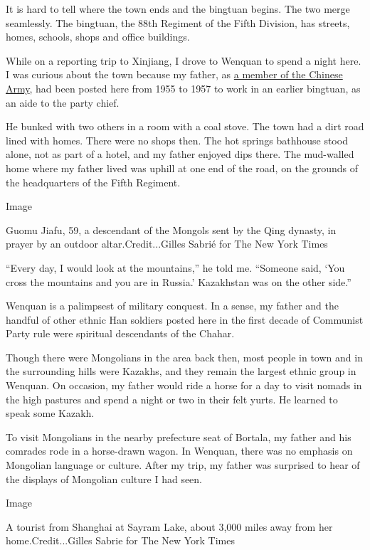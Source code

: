 It is hard to tell where the town ends and the bingtuan begins. The two
merge seamlessly. The bingtuan, the 88th Regiment of the Fifth Division,
has streets, homes, schools, shops and office buildings.

While on a reporting trip to Xinjiang, I drove to Wenquan to spend a
night here. I was curious about the town because my father, as
\href{https://www.nytimes3xbfgragh.onion/2016/12/29/world/asia/great-wall-china.html?mcubz=2\&_r=0}{a
member of the Chinese Army}, had been posted here from 1955 to 1957 to
work in an earlier bingtuan, as an aide to the party chief.

He bunked with two others in a room with a coal stove. The town had a
dirt road lined with homes. There were no shops then. The hot springs
bathhouse stood alone, not as part of a hotel, and my father enjoyed
dips there. The mud-walled home where my father lived was uphill at one
end of the road, on the grounds of the headquarters of the Fifth
Regiment.

Image

Guomu Jiafu, 59, a descendant of the Mongols sent by the Qing dynasty,
in prayer by an outdoor altar.Credit...Gilles Sabrié for The New York
Times

``Every day, I would look at the mountains,'' he told me. ``Someone
said, `You cross the mountains and you are in Russia.' Kazakhstan was on
the other side.''

Wenquan is a palimpsest of military conquest. In a sense, my father and
the handful of other ethnic Han soldiers posted here in the first decade
of Communist Party rule were spiritual descendants of the Chahar.

Though there were Mongolians in the area back then, most people in town
and in the surrounding hills were Kazakhs, and they remain the largest
ethnic group in Wenquan. On occasion, my father would ride a horse for a
day to visit nomads in the high pastures and spend a night or two in
their felt yurts. He learned to speak some Kazakh.

To visit Mongolians in the nearby prefecture seat of Bortala, my father
and his comrades rode in a horse-drawn wagon. In Wenquan, there was no
emphasis on Mongolian language or culture. After my trip, my father was
surprised to hear of the displays of Mongolian culture I had seen.

Image

A tourist from Shanghai at Sayram Lake, about 3,000 miles away from her
home.Credit...Gilles Sabrie for The New York Times

